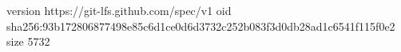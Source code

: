 version https://git-lfs.github.com/spec/v1
oid sha256:93b172806877498e85c6d1ce0d6d3732c252b083f3d0db28ad1c6541f115f0e2
size 5732
